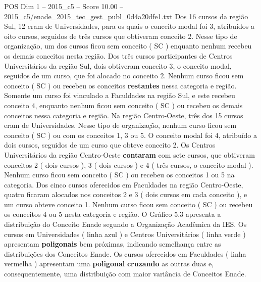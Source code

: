 \begin{textsample}{POS Dim 1 – 2015\_c5 – Score 10.00 – 2015\_c5/enade\_2015\_tec\_gest\_publ\_0d4a20dfe1.txt}
Dos 16 cursos da região Sul, 12 eram de Universidades, para os quais o conceito modal foi 3, atribuídos a oito cursos, seguidos de três cursos que obtiveram conceito 2.
Nesse tipo de organização, um dos cursos ficou sem conceito ( SC ) enquanto nenhum recebeu os demais conceitos nesta região.
Dos três cursos participantes de Centros Universitários da região Sul, dois obtiveram conceito 3, o conceito modal, seguidos de um curso, que foi alocado no conceito 2.
Nenhum curso ficou sem conceito ( SC ) ou recebeu os conceitos \textbf{restantes} nessa categoria e região.
Somente um curso foi vinculado a Faculdades na região Sul, e este recebeu conceito 4, enquanto nenhum ficou sem conceito ( SC ) ou recebeu os demais conceitos nessa categoria e região.
Na região Centro-Oeste, três dos 15 cursos eram de Universidades.
Nesse tipo de organização, nenhum curso ficou sem conceito ( SC ) ou com os conceitos 1, 3 ou 5.
O conceito modal foi 4, atribuído a dois cursos, seguidos de um curso que obteve conceito 2.
Os Centros Universitários da região Centro-Oeste \textbf{contaram} com sete cursos, que obtiveram conceitos 2 ( dois cursos ), 3 ( dois cursos ) e 4 ( três cursos, o conceito modal ).
Nenhum curso ficou sem conceito ( SC ) ou recebeu os conceitos 1 ou 5 na categoria.
Dos cinco cursos oferecidos em Faculdades na região Centro-Oeste, quatro ficaram alocados nos conceitos 2 e 3 ( dois cursos em cada conceito ), e um curso obteve conceito 1.
Nenhum curso ficou sem conceito ( SC ) ou recebeu os conceitos 4 ou 5 nesta categoria e região.
O Gráfico 5.3 apresenta a distribuição do Conceito Enade segundo a Organização Acadêmica da IES.
Os cursos em Universidades ( linha azul ) e Centros Universitários ( linha verde ) apresentam \textbf{poligonais} bem próximas, indicando semelhança entre as distribuições dos Conceitos Enade.
Os cursos oferecidos em Faculdades ( linha vermelha ) apresentam uma \textbf{poligonal} \textbf{cruzando} as outras duas e, consequentemente, uma distribuição com maior variância de Conceitos Enade.

\end{textsample}
